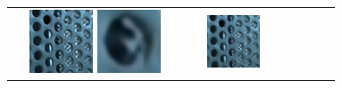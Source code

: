 \begin{figure}[ht!]
{\begin{tabular}{cccccc}
\begin{minipage}{0.180\textwidth}
        \end{minipage} &
        \begin{minipage}{0.180\textwidth}
            \centering
            \includegraphics[width=0.46\textwidth, height=0.46\textwidth,cfbox=blue 1pt 0pt]{img/qual/Perforated_Metal_3/DistgSSR/SR.png}
            \includegraphics[width=0.46\textwidth, height=0.46\textwidth,cfbox=red 1pt 0pt]{img/qual/Perforated_Metal_3/DistgSSR/SR.LAM.png}
        \end{minipage} &
        \begin{minipage}{0.180\textwidth}
            \centering
            \includegraphics[width=0.46\textwidth, height=0.46\textwidth,cfbox=blue 1pt 0pt]{img/qual/Perforated_Metal_3/LFT/SR.png}

\end{minipage}
\end{tabular}}
\end{figure}

